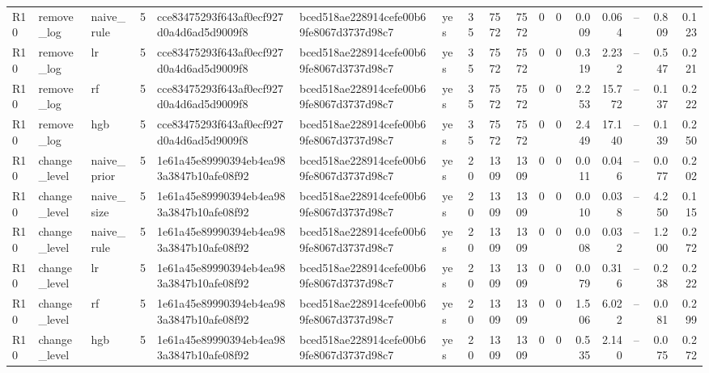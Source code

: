 \begin{table}[htbp]
{\begin{tabular}{lllrlllrrrrrrrrrr}
R10 & remove\_log & naive\_rule & 5 & cce83475293f643af0ecf927d0a4d6ad5d9009f8 & bced518ae228914cefe00b69fe8067d3737d98c7 & yes & 35 & 7572 & 7572 & 0 & 0 & 0.009 & 0.064 & -- & 0.809 & 0.123 \\
R10 & remove\_log & lr & 5 & cce83475293f643af0ecf927d0a4d6ad5d9009f8 & bced518ae228914cefe00b69fe8067d3737d98c7 & yes & 35 & 7572 & 7572 & 0 & 0 & 0.319 & 2.232 & -- & 0.547 & 0.221 \\
R10 & remove\_log & rf & 5 & cce83475293f643af0ecf927d0a4d6ad5d9009f8 & bced518ae228914cefe00b69fe8067d3737d98c7 & yes & 35 & 7572 & 7572 & 0 & 0 & 2.253 & 15.772 & -- & 0.137 & 0.222 \\
R10 & remove\_log & hgb & 5 & cce83475293f643af0ecf927d0a4d6ad5d9009f8 & bced518ae228914cefe00b69fe8067d3737d98c7 & yes & 35 & 7572 & 7572 & 0 & 0 & 2.449 & 17.140 & -- & 0.139 & 0.250 \\
R10 & change\_level & naive\_prior & 5 & 1e61a45e89990394eb4ea983a3847b10afe08f92 & bced518ae228914cefe00b69fe8067d3737d98c7 & yes & 20 & 1309 & 1309 & 0 & 0 & 0.011 & 0.046 & -- & 0.077 & 0.202 \\
R10 & change\_level & naive\_size & 5 & 1e61a45e89990394eb4ea983a3847b10afe08f92 & bced518ae228914cefe00b69fe8067d3737d98c7 & yes & 20 & 1309 & 1309 & 0 & 0 & 0.010 & 0.038 & -- & 4.250 & 0.115 \\
R10 & change\_level & naive\_rule & 5 & 1e61a45e89990394eb4ea983a3847b10afe08f92 & bced518ae228914cefe00b69fe8067d3737d98c7 & yes & 20 & 1309 & 1309 & 0 & 0 & 0.008 & 0.032 & -- & 1.200 & 0.272 \\
R10 & change\_level & lr & 5 & 1e61a45e89990394eb4ea983a3847b10afe08f92 & bced518ae228914cefe00b69fe8067d3737d98c7 & yes & 20 & 1309 & 1309 & 0 & 0 & 0.079 & 0.316 & -- & 0.238 & 0.222 \\
R10 & change\_level & rf & 5 & 1e61a45e89990394eb4ea983a3847b10afe08f92 & bced518ae228914cefe00b69fe8067d3737d98c7 & yes & 20 & 1309 & 1309 & 0 & 0 & 1.506 & 6.022 & -- & 0.081 & 0.299 \\
R10 & change\_level & hgb & 5 & 1e61a45e89990394eb4ea983a3847b10afe08f92 & bced518ae228914cefe00b69fe8067d3737d98c7 & yes & 20 & 1309 & 1309 & 0 & 0 & 0.535 & 2.140 & -- & 0.075 & 0.272 \\
\bottomrule
\end{tabular}}
\end{table}
